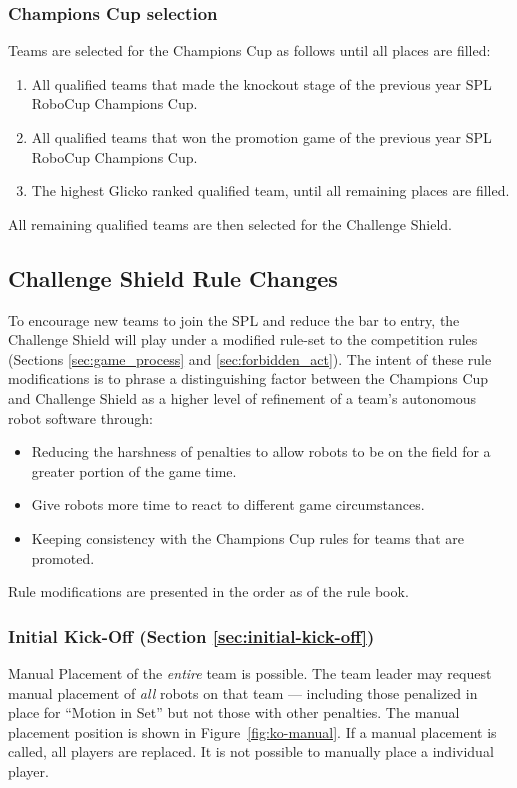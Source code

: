 \subsubsection{Champions Cup selection}

Teams are selected for the Champions Cup as follows until all places are filled:
\begin{enumerate}
    \item All qualified teams that made the knockout stage of the previous year SPL RoboCup Champions Cup.
    \item All qualified teams that won the promotion game  of the previous year SPL RoboCup Champions Cup.
    \item The highest Glicko ranked qualified team, until all remaining places are filled.
\end{enumerate}

All remaining qualified teams are then selected for the Challenge Shield.


\subsection{Challenge Shield Rule Changes}
\label{sec:cs-rule-changes}

To encourage new teams to join the SPL and reduce the bar to entry, the Challenge Shield will play under a modified rule-set to the competition rules (Sections \ref{sec:game_process} and \ref{sec:forbidden_act}). The intent of these rule modifications is to phrase a distinguishing factor between the Champions Cup and Challenge Shield as a higher level of refinement of a team's autonomous robot software through:
\begin{itemize}
    \item Reducing the harshness of penalties to allow robots to be on the field for a greater portion of the game time.
    \item Give robots more time to react to different game circumstances.
    \item Keeping consistency with the Champions Cup rules for teams that are promoted.
\end{itemize}

Rule modifications are presented in the order as of the rule book.

\subsubsection{Initial Kick-Off (Section \ref{sec:initial-kick-off})}
Manual Placement of the \emph{entire} team is possible. The team leader may request manual placement of \emph{all} robots on that team --- including those penalized in place for ``Motion in Set'' but not those with other penalties. The manual placement position is shown in Figure~\ref{fig:ko-manual}. If a manual placement is called, all players are replaced. It is not possible to manually place a individual player.


